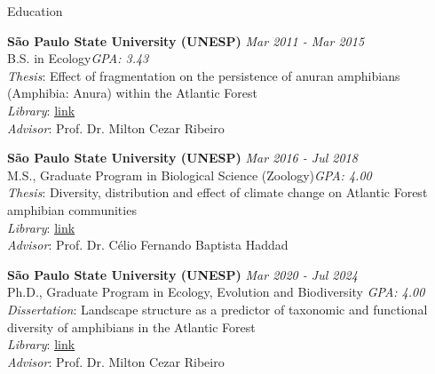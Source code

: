 \documentclass{resume}
\begin{document}
\begin{rSection}{Education}

\textbf{São Paulo State University (UNESP)} \hfill {\em Mar 2011 - Mar 2015}\\
B.S. in Ecology\hfill {\em GPA: 3.43}\\
\textit{Thesis}: Effect of fragmentation on the persistence of anuran amphibians (Amphibia: Anura) within the Atlantic Forest\\
\textit{Library}: \href{http://hdl.handle.net/11449/138991}{\underline{link}}\\
\textit{Advisor}: Prof. Dr. Milton Cezar Ribeiro

\textbf{São Paulo State University (UNESP)} \hfill {\em Mar 2016 - Jul 2018}\\
M.S., Graduate Program in Biological Science (Zoology)\hfill {\em GPA: 4.00}\\
\textit{Thesis}: Diversity, distribution and effect of climate change on Atlantic Forest amphibian communities\\
\textit{Library}: \href{http://hdl.handle.net/11449/154993}{\underline{link}}\\
\textit{Advisor}: Prof. Dr. Célio Fernando Baptista Haddad

\textbf{São Paulo State University (UNESP)} \hfill {\em Mar 2020 - Jul 2024}\\
Ph.D., Graduate Program in Ecology, Evolution and Biodiversity \hfill {\em GPA: 4.00}\\
\textit{Dissertation}: Landscape structure as a predictor of taxonomic and functional diversity of amphibians in the Atlantic Forest\\
\textit{Library}: \href{https://hdl.handle.net/11449/256726}{\underline{link}}\\
\textit{Advisor}: Prof. Dr. Milton Cezar Ribeiro

\end{rSection}

\end{document}
